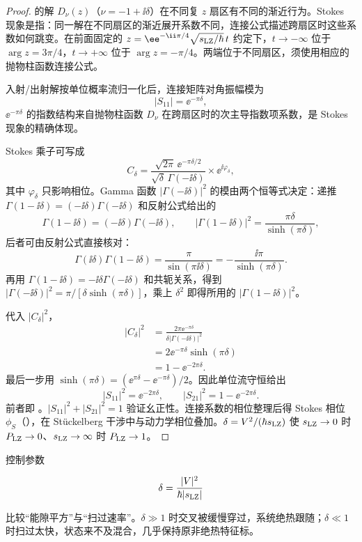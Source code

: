 \begin{proof}
 的解 $D_\nu(z)$（$\nu=-1+\ii\delta$）在不同复 $z$ 扇区有不同的渐近行为。Stokes 现象是指：同一解在不同扇区的渐近展开系数不同，连接公式描述跨扇区时这些系数如何跳变。在前面固定的 $z=\ee^{-\ii\pi/4}\sqrt{s_{\rm LZ}/\hbar}\,t$ 约定下，$t\to-\infty$ 位于 $\arg z=3\pi/4$，$t\to+\infty$ 位于 $\arg z=-\pi/4$。两端位于不同扇区，须使用相应的抛物柱函数连接公式。

入射/出射解按单位概率流归一化后，连接矩阵对角振幅模为
\[
 |S_{11}|=\ee^{-\pi\delta},
\]
$\ee^{-\pi\delta}$ 的指数结构来自抛物柱函数 $D_\nu$ 在跨扇区时的次主导指数项系数，是 Stokes 现象的精确体现。

Stokes 乘子可写成
\[
 C_\delta
 =\frac{\sqrt{2\pi}\,\ee^{-\pi\delta/2}}
 {\sqrt{\delta}\,\Gamma(-\ii\delta)}
 \times \ee^{\ii\varphi_\delta},
\]
其中 \(\varphi_\delta\) 只影响相位。Gamma 函数 $|\Gamma(-\ii\delta)|^2$ 的模由两个恒等式决定：递推 $\Gamma(1-\ii\delta)=(-\ii\delta)\Gamma(-\ii\delta)$ 和反射公式给出的
\[
 \Gamma(1-\ii\delta)=(-\ii\delta)\Gamma(-\ii\delta),
 \qquad
 |\Gamma(1-\ii\delta)|^2
 =\frac{\pi\delta}{\sinh(\pi\delta)},
\]
后者可由反射公式直接核对：
\[
 \Gamma(\ii\delta)\Gamma(1-\ii\delta)
 =\frac{\pi}{\sin(\pi\ii\delta)}
 =-\frac{\ii\pi}{\sinh(\pi\delta)}.
\]
再用 $\Gamma(1-\ii\delta)=-\ii\delta\Gamma(-\ii\delta)$ 和共轭关系，得到
$|\Gamma(-\ii\delta)|^2=\pi/[\delta\sinh(\pi\delta)]$，乘上 $\delta^2$ 即得所用的 $|\Gamma(1-\ii\delta)|^2$。

代入 $|C_\delta|^2$，
\begin{align*}
 |C_\delta|^2
 &=\frac{2\pi\ee^{-\pi\delta}}
 {\delta|\Gamma(-\ii\delta)|^2}\\
 &=2\ee^{-\pi\delta}\sinh(\pi\delta)\\
 &=1-\ee^{-2\pi\delta}.
\end{align*}
最后一步用 $\sinh(\pi\delta)=(\ee^{\pi\delta}-\ee^{-\pi\delta})/2$。因此单位流守恒给出
\[
 |S_{11}|^2=\ee^{-2\pi\delta},
 \qquad
 |S_{21}|^2=1-\ee^{-2\pi\delta}.
\]
前者即 。$|S_{11}|^2+|S_{21}|^2=1$ 验证幺正性。连接系数的相位整理后得 Stokes 相位 \(\phi_S\)（），在 Stückelberg 干涉中与动力学相位叠加。$\delta=V^2/(\hbar s_{\rm LZ})$ 使 $s_{\rm LZ}\to0$ 时 $P_{\rm LZ}\to0$、$s_{\rm LZ}\to\infty$ 时 $P_{\rm LZ}\to1$。
\end{proof}

控制参数

\[
\delta=\frac{|V|^2}{\hbar|s_{\rm LZ}|}
\]

比较“能隙平方”与“扫过速率”。\(\delta\gg1\) 时交叉被缓慢穿过，系统绝热跟随；\(\delta\ll1\) 时扫过太快，状态来不及混合，几乎保持原非绝热特征标。

